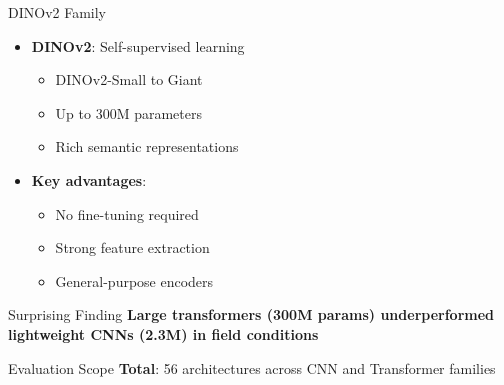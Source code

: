 \documentclass[aspectratio=43]{beamer}
\begin{document}
\begin{frame}
\begin{columns}
        \begin{column}{0.5\textwidth}
            \begin{exampleblock}{DINOv2 Family}
                \begin{itemize}
                    \item \textbf{DINOv2}: Self-supervised learning
                        \begin{itemize}
                            \item DINOv2-Small to Giant
                            \item Up to 300M parameters
                            \item Rich semantic representations
                        \end{itemize}
                    \item \textbf{Key advantages}:
                        \begin{itemize}
                            \item No fine-tuning required
                            \item Strong feature extraction
                            \item General-purpose encoders
                        \end{itemize}
                \end{itemize}
            \end{exampleblock}
            
            \begin{alertblock}{Surprising Finding}
                \textbf{Large transformers (300M params) underperformed lightweight CNNs (2.3M) in field conditions}
            \end{alertblock}
            
            \begin{block}{Evaluation Scope}
                \textbf{Total}: 56 architectures across CNN and Transformer families
            \end{block}
        \end{column}
    \end{columns}
\end{frame}
\end{document}
